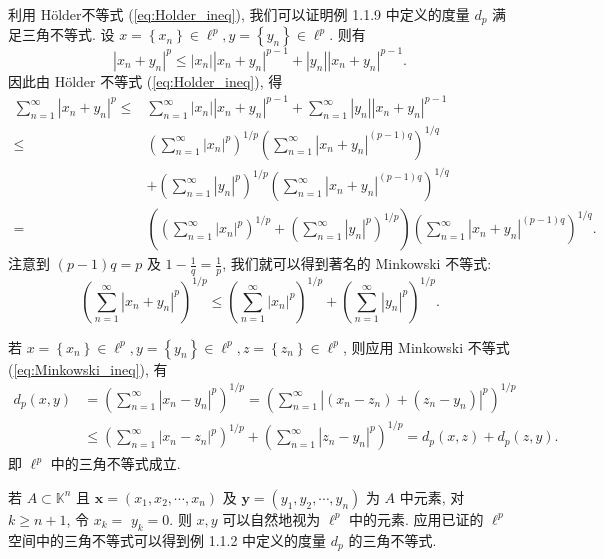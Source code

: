 \documentclass[openany]{ctexbook}
\theoremstyle{kaiti}
\theoremstyle{normal}
\begin{document}
利用 Hölder不等式 (\ref{eq:Holder_ineq}), 我们可以证明例 1.1.9 中定义的度量 $d_{p}$ 满足三角不等式. 设 $x=\left\{x_n\right\} \in \ell^{p}, y=\left\{y_n\right\} \in \ell^{p}$. 则有
$$
\left|x_n+y_n\right|^{p} \leqslant\left|x_n\right|\left|x_n+y_n\right|^{p-1}+\left|y_n\right|\left|x_n+y_n\right|^{p-1}.
$$
因此由 Hölder 不等式 (\ref{eq:Holder_ineq}), 得
$$
\begin{aligned}
\sum_{n=1}^{\infty}\left|x_n+y_n\right|^{p} \leqslant & \sum_{n=1}^{\infty}\left|x_n\right|\left|x_n+y_n\right|^{p-1}+\sum_{n=1}^{\infty}\left|y_n\right|\left|x_n+y_n\right|^{p-1} \\
\leqslant &\left(\sum_{n=1}^{\infty}\left|x_n\right|^{p}\right)^{1 / p}\left(\sum_{n=1}^{\infty}\left|x_n+y_n\right|^{(p-1) q}\right)^{1 / q} \\
&+\left(\sum_{n=1}^{\infty}\left|y_n\right|^{p}\right)^{1 / p}\left(\sum_{n=1}^{\infty}\left|x_n+y_n\right|^{(p-1) q}\right)^{1 / q} \\
=&\left(\left(\sum_{n=1}^{\infty}\left|x_n\right|^{p}\right)^{1 / p}+\left(\sum_{n=1}^{\infty}\left|y_n\right|^{p}\right)^{1 / p}\right)\left(\sum_{n=1}^{\infty}\left|x_n+y_n\right|^{(p-1) q}\right)^{1 / q}.
\end{aligned}
$$
注意到 $(p-1) q=p$ 及 $1-\frac{1}{q}=\frac{1}{p}$, 我们就可以得到著名的 Minkowski 不等式:
\begin{equation}
  \label{eq:Minkowski_ineq}
  \left(\sum_{n=1}^{\infty}\left|x_n+y_n\right|^{p}\right)^{1 / p} \leqslant\left(\sum_{n=1}^{\infty}\left|x_n\right|^{p}\right)^{1 / p}+\left(\sum_{n=1}^{\infty}\left|y_n\right|^{p}\right)^{1 / p}.
\end{equation}

若 $x=\left\{x_n\right\} \in \ell^{p}, y=\left\{y_n\right\} \in \ell^{p}, z=\left\{z_n\right\} \in \ell^{p}$, 则应用 Minkowski 不等式 (\ref{eq:Minkowski_ineq}), 有
$$
\begin{aligned}
d_{p}(x, y) &=\left(\sum_{n=1}^{\infty}\left|x_n-y_n\right|^{p}\right)^{1 / p}=\left(\sum_{n=1}^{\infty}\left|\left(x_n-z_n\right)+\left(z_n-y_n\right)\right|^{p}\right)^{1 / p} \\
& \leqslant\left(\sum_{n=1}^{\infty}\left|x_n-z_n\right|^{p}\right)^{1 / p}+\left(\sum_{n=1}^{\infty}\left|z_n-y_n\right|^{p}\right)^{1 / p}=d_{p}(x, z)+d_{p}(z, y).
\end{aligned}
$$
即 $\ell^{p}$ 中的三角不等式成立.

若 $A \subset \mathbb{K}^n$ 且 $\boldsymbol{x}=\left(x_1, x_2, \cdots, x_n\right)$ 及 $\boldsymbol{y}=\left(y_1, y_2, \cdots, y_n\right)$ 为 $A$ 中元素, 对 $k \geqslant n+1$, 令 $x_{k}=$ $y_{k}=0$. 则 $x, y$ 可以自然地视为 $\ell^{p}$ 中的元素. 应用已证的 $\ell^{p}$ 空间中的三角不等式可以得到例 1.1.2 中定义的度量 $d_{p}$ 的三角不等式.
\end{document}

